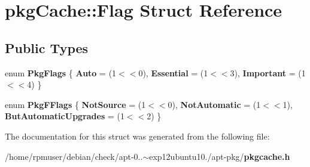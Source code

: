 \section{pkg\-Cache\-:\-:\-Flag \-Struct \-Reference}
\label{structpkgCache_1_1Flag}
\subsection*{\-Public \-Types}
\begin{DoxyCompactItemize}
\item 
enum {\bfseries \-Pkg\-Flags} \{ {\bfseries \-Auto} = (1$<$$<$0), 
{\bfseries \-Essential} = (1$<$$<$3), 
{\bfseries \-Important} = (1$<$$<$4)
 \}
\item 
enum {\bfseries \-Pkg\-F\-Flags} \{ {\bfseries \-Not\-Source} = (1$<$$<$0), 
{\bfseries \-Not\-Automatic} = (1$<$$<$1), 
{\bfseries \-But\-Automatic\-Upgrades} = (1$<$$<$2)
 \}
\end{DoxyCompactItemize}


\-The documentation for this struct was generated from the following file\-:\begin{DoxyCompactItemize}
\item 
/home/rpmuser/debian/check/apt-\/0..$\sim$exp12ubuntu10./apt-\/pkg/{\bf pkgcache.\-h}\end{DoxyCompactItemize}
